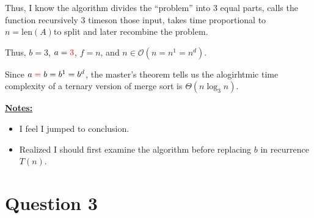 \documentclass[12pt]{article}
\begin{document}
\begin{itemize}
\begin{mdframed}
        \bigskip

        Thus, I know the algorithm divides the ``problem'' into 3 equal parts, calls
        the function recursively \color{red}3 times\color{black}\:on those input,
        takes time proportional to \color{red}$n = \text{len}(A)$\color{black}\:to
        split and later recombine the problem.

        \bigskip

        Thus, $b = 3$, $a = \color{red}3\color{black}$, $f = n$, and
        $n \in \mathcal{O}(n = n^1 = n^d)$.

        \bigskip

        Since $a \color{red}=\color{black} b = b^1 = b^d$, the master's
        theorem tells us the alogirhtmic time complexity of a ternary version of
        merge sort is \color{red}$\Theta(n\log_3 n)$\color{black}.

    \end{mdframed}
\end{itemize}

\bigskip

\underline{\textbf{Notes:}}

\bigskip

\begin{itemize}
    \item I feel I jumped to conclusion.
    \item Realized I should first examine the algorithm before replacing $b$
    in recurrence $T(n)$.
\end{itemize}

\bigskip

\section*{Question 3}

\bigskip
\end{document}
